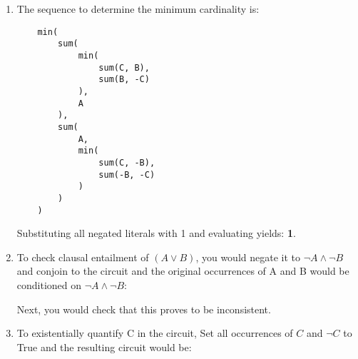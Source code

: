 \documentclass{article}
\begin{document}
 \section{}
\begin{enumerate}
    \item The sequence to determine the minimum cardinality is: \\
    \begin{verbatim}
    min(
        sum(
            min(
                sum(C, B),
                sum(B, -C)
            ),
            A
        ),
        sum(
            A,
            min(
                sum(C, -B),
                sum(-B, -C)
            )
        )
    )
    \end{verbatim}
    Substituting all negated literals with 1 and evaluating yields: \textbf{1}.
    
    \item To check clausal entailment of $(A \lor B)$, you would negate it to $\lnot A \land \lnot B$ and conjoin to the circuit and the original occurrences of A and B would be conditioned on $\lnot A \land \lnot B$:
    \begin{center}
    \end{center}
    Next, you would check that this proves to be inconsistent.
    \item To existentially quantify C in the circuit, Set all occurrences of $C$ and $\lnot C$ to True and the resulting circuit would be:
    \begin{center}
    \end{center}
\end{enumerate}
\clearpage
\end{document}
